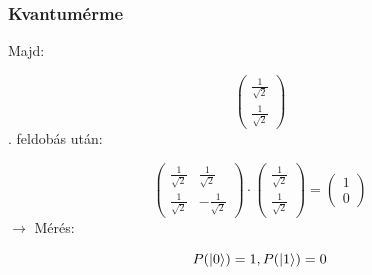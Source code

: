 \documentclass[aspectratio=169]{beamer}
\begin{document}
\begin{frame}
  \frametitle{Kvantumérme}

  Majd:

  \[\begin{pmatrix}
      \frac{1}{\sqrt{2}} \\ \frac{1}{\sqrt{2}}
    \end{pmatrix}\]
  . feldobás után:

  \[\begin{pmatrix} \frac{1}{\sqrt{2}} & \frac{1}{\sqrt{2}}
      \\ \frac{1}{\sqrt{2}} & -\frac{1}{\sqrt{2}}\end{pmatrix} \cdot
    \begin{pmatrix} \frac{1}{\sqrt{2}} \\ \frac{1}{\sqrt{2}} \end{pmatrix} = \begin{pmatrix}
      1 \\ 0
    \end{pmatrix} \]
  \pause
  $\rightarrow$ Mérés:

  \[P(\ket{0}) = 1, P(\ket{1}) = 0\]


\end{frame}
\end{document}

